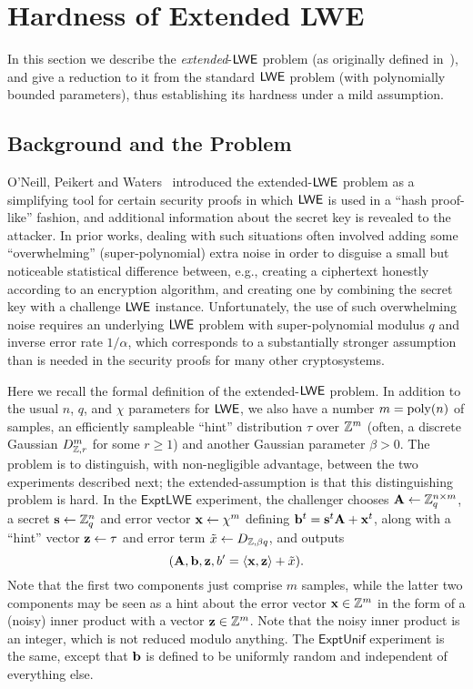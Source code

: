 
\section{Hardness of Extended LWE}
\label{sec:extended-lwe}

In this section we describe the \emph{extended}-$\mathsf{LWE}$ problem (as
originally defined in~\cite{DBLP:conf/crypto/ONeillPW11}), and give a
reduction to it from the standard $\mathsf{LWE}$ problem (with polynomially
bounded parameters), thus establishing its hardness under a mild
assumption.

\subsection{Background and the Problem}

O'Neill, Peikert and Waters~\cite{DBLP:conf/crypto/ONeillPW11}
introduced the extended-$\mathsf{LWE}$ problem as a simplifying tool for
certain security proofs in which $\mathsf{LWE}$ is used in a ``hash
proof-like'' fashion, and additional information about the secret key
is revealed to the attacker.  In prior works, dealing with such
situations often involved adding some ``overwhelming''
(super-polynomial) extra noise in order to disguise a small but
noticeable statistical difference between, e.g., creating a ciphertext
honestly according to an encryption algorithm, and creating one by
combining the secret key with a challenge $\mathsf{LWE}$ instance.
Unfortunately, the use of such overwhelming noise requires an
underlying $\mathsf{LWE}$ problem with super-polynomial modulus $q$ and
inverse error rate $1/\alpha$, which corresponds to a substantially
stronger assumption than is needed in the security proofs for many
other cryptosystems.

Here we recall the formal definition of the extended-$\mathsf{LWE}$ problem.
In addition to the usual $n$, $q$, and $\chi$ parameters for $\mathsf{LWE}$,
we also have a number $m=\operatorname{poly}(n)$ of \lwe samples, an efficiently
sampleable ``hint'' distribution $\tau$ over $\mathbb{Z}^{m}$ (often, a
discrete Gaussian $D^{m}_{\mathbb{Z},r}$ for some $r \geq 1$) and another
Gaussian parameter $\beta > 0$.  The problem is to distinguish, with
non-negligible advantage, between the two experiments described next;
the extended-\lwe assumption is that this distinguishing problem is
hard.  In the $\mathsf{ExptLWE}$ experiment, the challenger chooses
$\mathbf{A} \gets \mathbb{Z}_q^{n \times m}$, a secret $\mathbf{s} \gets \mathbb{Z}_q^{n}$ and
error vector $\mathbf{x} \gets \chi^{m}$ defining $\mathbf{b}^{t} = \mathbf{s}^{t}
\mathbf{A} + \mathbf{x}^{t}$, along with a ``hint'' vector $\mathbf{z} \gets \tau$
and error term $\tilde{x} \gets D_{\mathbb{Z},\beta q}$, and outputs
\[ (\mathbf{A}, \mathbf{b}, \mathbf{z}, b'=\langle{\ensuremath{\mathbf{x}}, \ensuremath{\mathbf{z}}}\rangle + \tilde{x}). \] Note
that the first two components just comprise $m$ \lwe samples, while
the latter two components may be seen as a hint about the error vector
$\mathbf{x} \in \mathbb{Z}^{m}$ in the form of a (noisy) inner product with a
vector $\mathbf{z} \in \mathbb{Z}^{m}$.  Note that the noisy inner product is an
integer, which is not reduced modulo anything.  The
$\mathsf{ExptUnif}$ experiment is the same, except that $\mathbf{b}$ is
defined to be uniformly random and independent of everything else.

